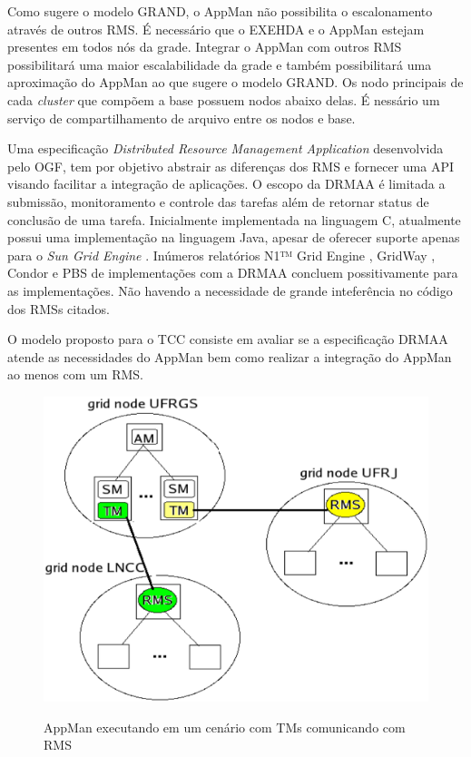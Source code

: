 Como sugere o modelo GRAND, o AppMan não possibilita o escalonamento através de outros RMS. É necessário que o EXEHDA e o AppMan estejam presentes em todos nós da grade. Integrar o AppMan com outros RMS possibilitará uma maior escalabilidade da grade e também possibilitará uma aproximação do AppMan ao que sugere o modelo GRAND. Os nodo principais de cada {\it cluster} que compõem a base possuem nodos abaixo delas. É nessário um serviço de compartilhamento de arquivo entre os nodos e base.

Uma especificação {\it Distributed Resource Management Application} \cite{Rajic2002} desenvolvida pelo OGF, tem por objetivo abstrair as diferenças dos RMS e fornecer uma API visando facilitar a integração de aplicações. O escopo da DRMAA é limitada a submissão, monitoramento e controle das tarefas além de retornar status de conclusão de uma tarefa. Inicialmente implementada na linguagem C, atualmente possui uma implementação na linguagem Java, apesar de oferecer suporte apenas para o {\it Sun Grid Engine} \cite{Templeton}.
Inúmeros relatórios N1™ Grid Engine \cite{Templeton2006}, GridWay \cite{Herrera2007}, Condor \cite{Troeger2007} e PBS \cite{Ciesnik2007} de implementações com a DRMAA concluem possitivamente para as implementações. Não havendo a necessidade de grande inteferência no código dos RMSs citados.

O modelo proposto para o TCC consiste em avaliar se a especificação DRMAA atende as necessidades do AppMan bem como realizar a integração do AppMan ao menos com um RMS.



\begin{figure}[h]
\center
\includegraphics[scale=.2]{img/AppManRMS.eps}
\label{AppManRMS}
\caption{AppMan executando em um cenário com TMs comunicando com RMS}
\end{figure}

